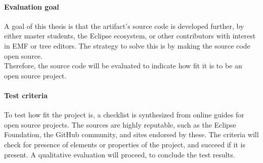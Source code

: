 \paragraph{Evaluation goal}
A goal of this thesis is that the artifact's source code is developed further, by either master students, the Eclipse ecosystem, or other contributors with interest in \acrshort{EMF} or tree editors.
The strategy to solve this is by making the source code \gls{open source}.\\

Therefore, the source code will be evaluated to indicate how fit it is to be an \gls{open source} project.


\paragraph{Test criteria}
To test how fit the project is, a checklist is synthesized from online guides for open source projects.
The sources are highly reputable, such as the Eclipse Foundation, the GitHub community, and sites endorsed by these.
The criteria will check for presence of elements or properties of the project, and succeed if it is present.
A qualitative evaluation will proceed, to conclude the test results.
